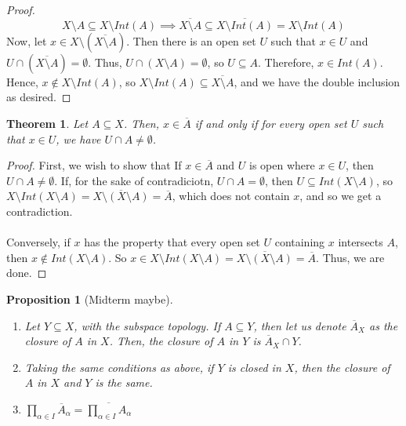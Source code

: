 \documentclass{article}
\newtheorem{theorem}{Theorem}
\newtheorem{proposition}{Proposition}
\begin{document}
 \begin{proof}
 $$X\setminus A\subseteq X\setminus Int(A)\implies \overline{X\setminus A}\subseteq \overline{X\setminus Int(A)}=X\setminus Int(A)$$
 Now, let $x\in X\setminus (\overline{X\setminus A})$. Then there is an open set $U$ such that $x\in U$ and $U\cap (\overline{X\setminus A})=\emptyset$. Thus, $U\cap (X\setminus A)=\emptyset$, so $U\subseteq A$. Therefore, $x\in Int(A)$.  Hence, $x\not\in X\setminus Int(A)$, so $X\setminus Int(A)\subseteq \overline{X\setminus A}$, and we have the double inclusion as desired.
 \end{proof}
 \newpage
 \begin{theorem}
 Let $A\subseteq X$. Then, $x\in\overline{A}$ if and only if for every open set $U$ such that $x\in U$, we have $U\cap A\neq \emptyset$.
 \end{theorem}
 \begin{proof}
 First, we wish to show that If $x\in\overline{A}$ and $U$ is open where $x\in U$, then $U\cap A\neq\emptyset$. If, for the sake of contradiciotn, $U\cap A=\emptyset$, then $U\subseteq Int(X\setminus A)$, so $X\setminus Int(X\setminus A)=\overline{X\setminus (X\setminus A)}=\overline{A}$, which does not contain $x$, and so we get a contradiction.\\
 \\
 Conversely, if $x$ has the property that every open set $U$ containing $x$ intersects $A$, then $x\not\in Int(X\setminus A)$. So $x\in X\setminus Int(X\setminus A)=\overline{X\setminus(X\setminus A)}=\overline{A}$. Thus, we are done.
 \end{proof}
 \begin{proposition}[Midterm maybe]
 \begin{enumerate}[1)]
     \item Let $Y\subseteq X$, with the subspace topology. If $A\subseteq Y$, then let us denote $\overline{A}_X$ as the closure of $A$ in $X$. Then, the closure of $A$ in $Y$ is $\overline{A}_X\cap Y$.
     \item Taking the same conditions as above, if $Y$ is closed in $X$, then the closure of $A$ in $X$ and $Y$ is the same.
     \item $\displaystyle \prod_{\alpha\in I}\overline{A}_\alpha=\overline{\prod_{\alpha\in I}A_\alpha}$
 \end{enumerate}
 \end{proposition}
\end{document}
